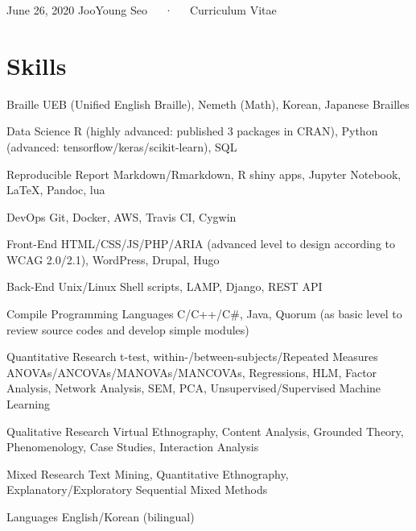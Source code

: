 \documentclass[11pt, a4paper]{awesome-cv}
\begin{document}
\makecvheader

\makecvfooter
  {June 26, 2020}
    {JooYoung Seo~~~·~~~Curriculum Vitae}
  {\thepage}





\hypertarget{skills}{%
\section{Skills}\label{skills}}

\begin{cvskills}
  \cvskill
    {Braille}
    {UEB (Unified English Braille), Nemeth (Math), Korean, Japanese Brailles}

  \cvskill
    {Data Science}
    {R (highly advanced: published 3 packages in CRAN), Python (advanced: tensorflow/keras/scikit-learn), SQL}

  \cvskill
    {Reproducible Report}
    {Markdown/Rmarkdown, R shiny apps, Jupyter Notebook, LaTeX, Pandoc, lua}

  \cvskill
    {DevOps}
    {Git, Docker, AWS, Travis CI, Cygwin}

  \cvskill
    {Front-End}
    {HTML/CSS/JS/PHP/ARIA (advanced level to design according to WCAG 2.0/2.1), WordPress, Drupal, Hugo}

  \cvskill
    {Back-End}
    {Unix/Linux Shell scripts, LAMP, Django, REST API}

  \cvskill
    {Compile Programming Languages}
    {C/C++/C\#, Java, Quorum (as basic level to review source codes and develop simple modules)}

  \cvskill
    {Quantitative Research}
    {t-test, within-/between-subjects/Repeated Measures ANOVAs/ANCOVAs/MANOVAs/MANCOVAs, Regressions, \newline HLM, Factor Analysis, Network Analysis, SEM, PCA, Unsupervised/Supervised Machine Learning}

  \cvskill
    {Qualitative Research}
    {Virtual Ethnography, Content Analysis, Grounded Theory, Phenomenology, Case Studies, Interaction Analysis}

  \cvskill
    {Mixed Research}
    {Text Mining, Quantitative Ethnography, Explanatory/Exploratory Sequential Mixed Methods}

  \cvskill
    {Languages}
    {English/Korean (bilingual)}
\end{cvskills}
\end{document}
